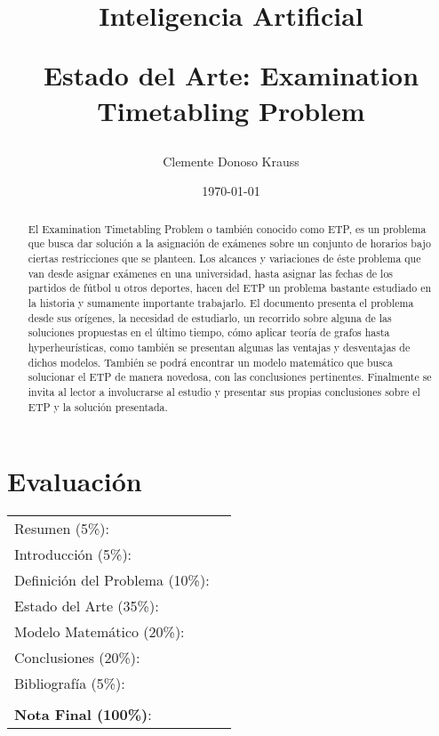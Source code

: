 \documentclass[letter, 10pt]{article}
\begin{document}
\title{Inteligencia Artificial \\ \begin{Large}Estado del Arte: Examination Timetabling Problem\end{Large}}
\author{Clemente Donoso Krauss}
\date{\today}
\maketitle


\section*{Evaluaci\'on}

\begin{tabular}{ll}
Resumen (5\%): & \underline{\hspace{2cm}} \\
Introducci\'on (5\%):  & \underline{\hspace{2cm}} \\
Definici\'on del Problema (10\%):  & \underline{\hspace{2cm}} \\
Estado del Arte (35\%):  & \underline{\hspace{2cm}} \\
Modelo Matem\'atico (20\%): &  \underline{\hspace{2cm}}\\
Conclusiones (20\%): &  \underline{\hspace{2cm}}\\
Bibliograf\'ia (5\%): & \underline{\hspace{2cm}}\\
 &  \\
\textbf{Nota Final (100\%)}:   & \underline{\hspace{2cm}}
\end{tabular}
\vspace{2cm}


\begin{abstract}
El Examination Timetabling Problem o también conocido como ETP, es un problema que busca dar solución a la asignación de exámenes sobre un conjunto de horarios bajo ciertas restricciones que se planteen. Los alcances y variaciones de éste problema que van desde asignar exámenes en una universidad, hasta asignar las fechas de los partidos de fútbol u otros deportes, hacen del ETP un problema bastante estudiado en la historia y sumamente importante trabajarlo. El documento presenta el problema desde sus orígenes, la necesidad de estudiarlo, un recorrido sobre alguna de las soluciones propuestas en el último tiempo, cómo aplicar teoría de grafos hasta hyperheurísticas, como también se presentan algunas las ventajas y desventajas de dichos modelos. También se podrá encontrar un modelo matemático que busca solucionar el ETP de manera novedosa, con las conclusiones pertinentes. Finalmente se invita al lector a involucrarse al estudio y presentar sus propias conclusiones sobre el ETP y la solución presentada.
\end{abstract}
\end{document}

